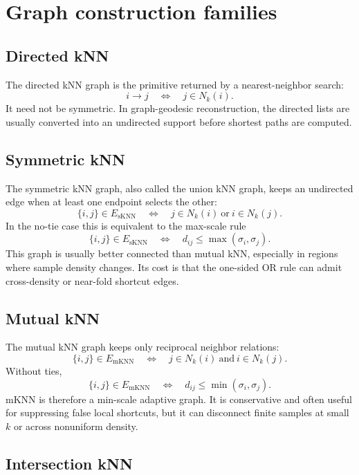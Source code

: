 \documentclass[11pt]{article}
\begin{document}
\section{Graph construction families}

\subsection{Directed kNN}

The directed kNN graph is the primitive returned by a nearest-neighbor search:
\[
  i\to j
  \quad\Longleftrightarrow\quad
  j\in N_k(i).
\]
It need not be symmetric.  In graph-geodesic reconstruction, the directed lists are usually
converted into an undirected support before shortest paths are computed.

\subsection{Symmetric kNN}

The symmetric kNN graph, also called the union kNN graph, keeps an undirected edge when at
least one endpoint selects the other:
\[
  \{i,j\}\in E_{\mathrm{sKNN}}
  \quad\Longleftrightarrow\quad
  j\in N_k(i)\ \text{or}\ i\in N_k(j).
\]
In the no-tie case this is equivalent to the max-scale rule
\[
  \{i,j\}\in E_{\mathrm{sKNN}}
  \quad\Longleftrightarrow\quad
  d_{ij}\le \max(\sigma_i,\sigma_j).
\]
This graph is usually better connected than mutual kNN, especially in regions where sample
density changes.  Its cost is that the one-sided OR rule can admit cross-density or
near-fold shortcut edges.

\subsection{Mutual kNN}

The mutual kNN graph keeps only reciprocal neighbor relations:
\[
  \{i,j\}\in E_{\mathrm{mKNN}}
  \quad\Longleftrightarrow\quad
  j\in N_k(i)\ \text{and}\ i\in N_k(j).
\]
Without ties,
\[
  \{i,j\}\in E_{\mathrm{mKNN}}
  \quad\Longleftrightarrow\quad
  d_{ij}\le \min(\sigma_i,\sigma_j).
\]
mKNN is therefore a min-scale adaptive graph.  It is conservative and often useful for
suppressing false local shortcuts, but it can disconnect finite samples at small \(k\) or
across nonuniform density.

\subsection{Intersection kNN}
\end{document}
